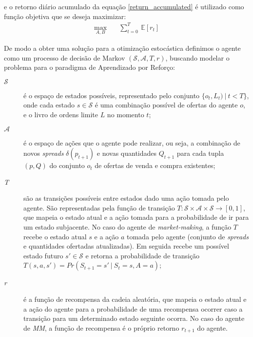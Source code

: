 e o retorno diário acumulado da equação \ref{return_accumulated} é utilizado como função objetiva que se deseja maximizar:
\begin{equation} \label{objective_equation}
	\begin{aligned}
		\max_{A, B} \quad & \sum_{t=0}^{T} \ \mathbb{E} [r_{t}]
	\end{aligned}
\end{equation}

De modo a obter uma solução para a otimização estocástica definimos o agente como um processo de decisão de Markov $(\mathcal{S}, \mathcal{A}, T, r)$, buscando modelar o problema para o paradigma de Aprendizado por Reforço:

\begin{description}
	\item[$\mathcal{S}$] 
	é o espaço de estados possíveis, representado pelo conjunto $\{o_{t}, L_{t}) \ | \ t < T\}$, onde cada estado $s \in \mathcal{S}$ é uma combinação possível de ofertas do agente $o$, e o livro de ordens limite $L$ no momento $t$;
	
	\item[$\mathcal{A}$] é o espaço de ações que o agente pode realizar, ou seja, a combinação de novos \textit{spreads} $\delta(p_{t + 1})$ e novas quantidades $Q_{t+1}$ para cada tupla $(p, Q)$ do conjunto $o_{t}$ de ofertas de venda e compra existentes;
	
	\item[\textit{T}] são as transições possíveis entre estados dado uma ação tomada pelo agente. São representadas pela função de transição $T :  \mathcal{S} \times \mathcal{A} \times \mathcal{S} \rightarrow [0, 1]$, que mapeia o estado atual e a ação tomada para a probabilidade de ir para um estado subjacente. No caso do agente de \textit{market-making}, a função $T$ recebe o estado atual $s$ e a ação $a$ tomada pelo agente (conjunto de \textit{spreads} e quantidades ofertadas atualizadas). Em seguida recebe um possível estado futuro $s' \in \mathcal{S}$ e retorna a probabilidade de transição $T(s, a, s') = Pr(S_{t+1} = s' \ | \ S_{t} = s, A = a)$;
	
	\item[\textit{r}] é a função de recompensa da cadeia aleatória, que mapeia o estado atual e a ação do agente para a probabilidade de uma recompensa ocorrer caso a transição para um determinado estado seguinte ocorra. No caso do agente de \textit{MM}, a função de recompensa é o próprio retorno $r_{t+1}$ do agente.
\end{description}


